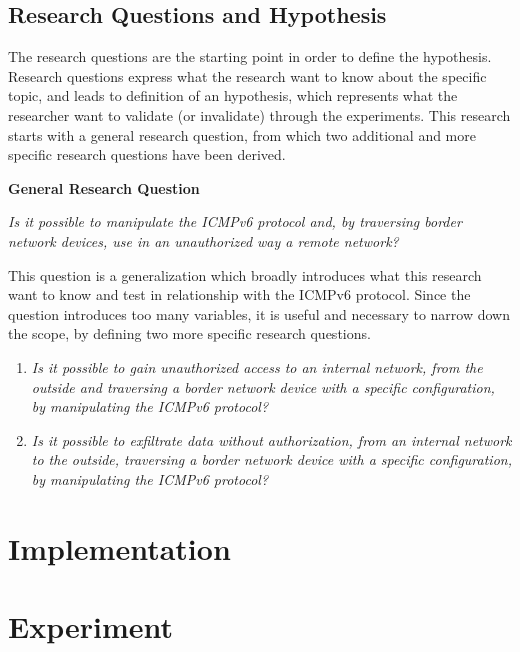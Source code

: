 \documentclass[12pt]{article}
\begin{document}
\subsection{Research Questions and Hypothesis}

The research questions are the starting point in order to define the hypothesis. Research questions express what the research want to know about the specific topic, and leads to definition of an hypothesis, which represents what the researcher want to validate (or invalidate) through the experiments. This research starts with a general research question, from which two additional and more specific research questions have been derived.

\textbf{General Research Question}

\textit{Is it possible to manipulate the ICMPv6 protocol and, by traversing border network devices, use in an unauthorized way a remote network?}

This question is a generalization which broadly introduces what this research want to know and test in relationship with the ICMPv6 protocol. Since the question introduces too many variables, it is useful and necessary to narrow down the scope, by defining two more specific research questions.
\begin{enumerate}
 \item \textit{Is it possible to gain unauthorized access to an internal network, from the outside and traversing a border network device with a specific configuration, by manipulating the ICMPv6 protocol?}
 \item \textit{Is it possible to exfiltrate data without authorization, from an internal network to the outside, traversing a border network device with a specific configuration, by manipulating the ICMPv6 protocol?}
\end{enumerate}





\pagebreak

\section{Implementation}
\label{sec:4}

\pagebreak

\section{Experiment}
\label{sec:5}
\end{document}
